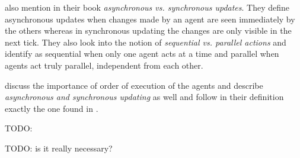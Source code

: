 \cite{wilensky_introduction_2015} also mention in their book \textit{asynchronous vs. synchronous updates}. They define asynchronous updates when changes made by an agent are seen immediately by the others whereas in synchronous updating the changes are only visible in the next tick. They also look into the notion of \textit{sequential vs. parallel actions} and identify as sequential when only one agent acts at a time and parallel when agents act truly parallel, independent from each other.

\cite{railsback_agent-based_2011} discuss the importance of order of execution of the agents and describe \textit{asynchronous and synchronous updating} as well and follow in their definition exactly the one found in \cite{wilensky_introduction_2015}.

TODO: \cite{page_incentives_1997}

TODO: \cite{polhill_what_2006} is it really necessary?